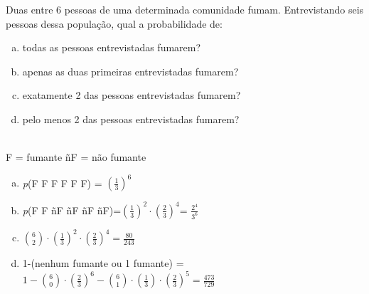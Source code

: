 \begin{ex}
 Duas entre 6 pessoas de uma determinada comunidade fumam. Entrevistando seis pessoas dessa população, qual a probabilidade de:
    \begin{enumerate}[(a)]
    \item todas as pessoas entrevistadas fumarem?
    \item apenas as duas primeiras entrevistadas fumarem?
    \item exatamente 2 das pessoas entrevistadas fumarem?
    \item pelo menos 2 das pessoas entrevistadas fumarem?
    \end{enumerate}
      \begin{sol}
         \phantom{A}  \\
        F = fumante \hspace{0.2cm} ñF = não fumante
        \begin{enumerate} [(a)]
            \item \textit{p}(F F F F F F) = $(\frac{1}{3})^6$
            \item \textit{p}(F F ñF ñF ñF ñF)=$(\frac{1}{3})^2\cdot(\frac{2}{3})^4$= $\frac{2^4}{3^6}$
            \item $\binom{6}{2}\cdot(\frac{1}{3})^2\cdot(\frac{2}{3})^4 = \frac{80}{243}$
            \item 1-(nenhum fumante ou 1 fumante) =
            $1-\binom{6}{0}\cdot (\frac{2}{3})^6-\binom{6}{1}\cdot(\frac{1}{3})\cdot(\frac{2}{3})^5=\frac{473}{729}$
        \end{enumerate}
      \end{sol}
\end{ex}